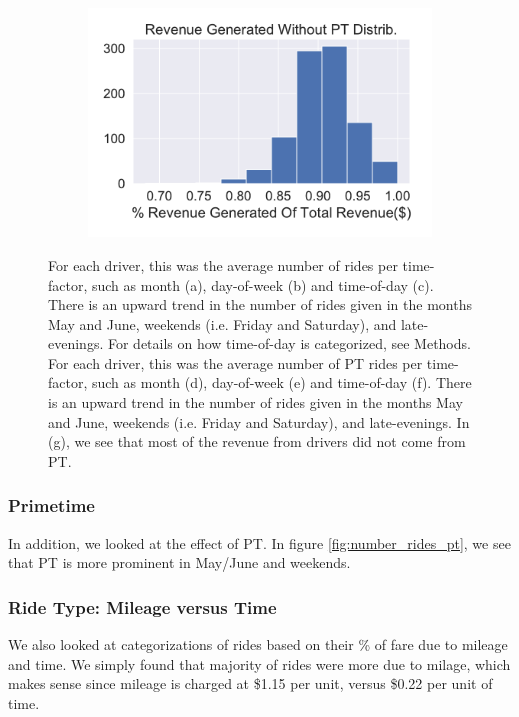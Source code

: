 \documentclass{report}
\begin{document}
\begin{figure}[!htb]
\begin{subfigure}[t]{0.24\textwidth}
					\caption{}
				\end{subfigure}
				\begin{subfigure}[t]{0.24\textwidth}
					\includegraphics[width=\linewidth]{pt_analysis/pre_pt_rev_percentage.pdf}
					\caption{}
				\end{subfigure}
				\caption{}
				\label{fig:number_rides_pt}

				\caption{For each driver, this was the average number of rides per time-factor, such as month (a), day-of-week (b) and time-of-day (c). There is an upward trend in the number of rides given in the months May and June, weekends (i.e. Friday and Saturday), and late-evenings. For details on how time-of-day is categorized, see Methods. For each driver, this was the average number of PT rides per time-factor, such as month (d), day-of-week (e) and time-of-day (f). There is an upward trend in the number of rides given in the months May and June, weekends (i.e. Friday and Saturday), and late-evenings. In (g), we see that most of the revenue from drivers did not come from PT.
				}
				\label{fig:number_rides_time}
			\end{figure}

		\subsubsection{Primetime}
			In addition, we looked at the effect of PT. In figure \ref{fig:number_rides_pt}, we see that PT is more prominent in May/June and weekends.

		\subsubsection{Ride Type: Mileage versus Time}
			We also looked at categorizations of rides based on their \% of fare due to mileage and time. We simply found that majority of rides were more due to milage, which makes sense since mileage is charged at \$1.15 per unit, versus \$0.22 per unit of time. 
\end{document}
